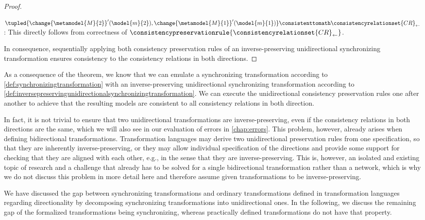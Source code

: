 \begin{proof}
\begin{properenumerate}
        \item $\tupled{\change{\metamodel{M}{2}}'(\model{m}{2}), \change{\metamodel{M}{1}}'(\model{m}{1})} \consistenttomath \consistencyrelationset{CR}_{\leftarrow}$:
        This directly follows from correctness of $\consistencypreservationrule{\consistencyrelationset{CR}_{\leftarrow}}$.
    \end{properenumerate}
    In consequence, sequentially applying both consistency preservation rules of an inverse-preserving unidirectional synchronizing transformation ensures consistency to the consistency relations in both directions.
\end{proof}

As a consequence of the theorem, we know that we can emulate a synchronizing transformation according to \autoref{def:synchronizingtransformation} with an inverse-preserving unidirectional synchronizing transformation according to \autoref{def:inversepreservingunidirectionalsynchronizingtransformation}.
We can execute the unidirectional consistency preservation rules one after another to achieve that the resulting models are consistent to all consistency relations in both direction.

In fact, it is not trivial to ensure that two unidirectional transformations are inverse-preserving, even if the consistency relations in both directions are the same, which we will also see in our evaluation of errors in \autoref{chap:errors}.
This problem, however, already arises when defining bidirectional transformations.
Transformation languages may derive two unidirectional preservation rules from one specification, so that they are inherently inverse-preserving, or they may allow individual specification of the directions and provide some support for checking that they are aligned with each other, e.g., in the sense that they are inverse-preserving.
This is, however, an isolated and existing topic of research and a challenge that already has to be solved for a single bidirectional transformation rather than a network, which is why we do not discuss this problem in more detail here and therefore assume given transformations to be inverse-preserving.

We have discussed the gap between synchronizing transformations and ordinary transformations defined in transformation languages regarding directionality by decomposing synchronizing transformations into unidirectional ones.
In the following, we discuss the remaining gap of the formalized transformations being synchronizing, whereas practically defined transformations do not have that property.


